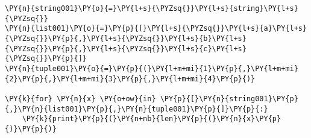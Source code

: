 \begin{Verbatim}[commandchars=\\\{\}]
\PY{n}{string001}\PY{o}{=}\PY{l+s}{\PYZsq{}}\PY{l+s}{string}\PY{l+s}{\PYZsq{}}
\PY{n}{list001}\PY{o}{=}\PY{p}{[}\PY{l+s}{\PYZsq{}}\PY{l+s}{a}\PY{l+s}{\PYZsq{}}\PY{p}{,}\PY{l+s}{\PYZsq{}}\PY{l+s}{b}\PY{l+s}{\PYZsq{}}\PY{p}{,}\PY{l+s}{\PYZsq{}}\PY{l+s}{c}\PY{l+s}{\PYZsq{}}\PY{p}{]}
\PY{n}{tuple001}\PY{o}{=}\PY{p}{(}\PY{l+m+mi}{1}\PY{p}{,}\PY{l+m+mi}{2}\PY{p}{,}\PY{l+m+mi}{3}\PY{p}{,}\PY{l+m+mi}{4}\PY{p}{)}

\PY{k}{for} \PY{n}{x} \PY{o+ow}{in} \PY{p}{[}\PY{n}{string001}\PY{p}{,}\PY{n}{list001}\PY{p}{,}\PY{n}{tuple001}\PY{p}{]}\PY{p}{:}
    \PY{k}{print}\PY{p}{(}\PY{n+nb}{len}\PY{p}{(}\PY{n}{x}\PY{p}{)}\PY{p}{)}
\end{Verbatim}
